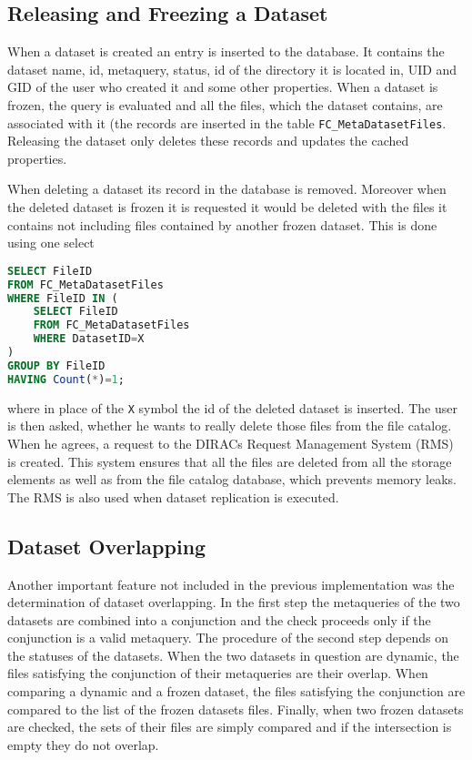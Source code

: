 \subsection{Releasing and Freezing a Dataset}

When a dataset is created an entry is inserted to the database. It contains the dataset name, id, metaquery, 
status, id of the directory it is located in, UID and GID of the user who created it and some other 
properties. When a dataset is frozen, the query is evaluated and all the files, which the
dataset contains, are associated with it (the records are inserted in the table \texttt{FC\_MetaDatasetFiles}.
Releasing the dataset only deletes these records and updates the cached properties. 

When deleting a dataset its record in the database is removed. Moreover when the deleted dataset is frozen
it is requested it would be deleted with the files it contains not including files contained by another frozen
dataset. This is done using one select

\begin{lstlisting}[language=sql]
SELECT FileID 
FROM FC_MetaDatasetFiles 
WHERE FileID IN (
	SELECT FileID 
	FROM FC_MetaDatasetFiles 
	WHERE DatasetID=X
) 
GROUP BY FileID 
HAVING Count(*)=1;
\end{lstlisting}

\noindent where in place of the \texttt{X} symbol the id of the deleted dataset is inserted. The user is then 
asked, whether he wants to really delete those files from the file catalog. When he agrees, a request to
the DIRACs Request Management System (RMS) is created. This system ensures that all the files
are deleted from all the storage elements as well as from the file catalog database, 
which prevents memory leaks. The RMS is also used when dataset replication is executed.

\subsection{Dataset Overlapping}

Another important feature not included in the previous implementation was the determination of  
dataset overlapping. In the first step the metaqueries of the two datasets are combined
into a conjunction and the check proceeds only if the conjunction is a valid metaquery.
The procedure of the second step depends on the statuses of the datasets. When the two
datasets in question are dynamic, the files satisfying the conjunction of their metaqueries
are their overlap. When comparing a dynamic and a frozen dataset, the files satisfying 
the conjunction are compared to the list of the frozen datasets files. Finally, when 
two frozen datasets are checked, the sets of their files are simply compared and if 
the intersection is empty they do not overlap.